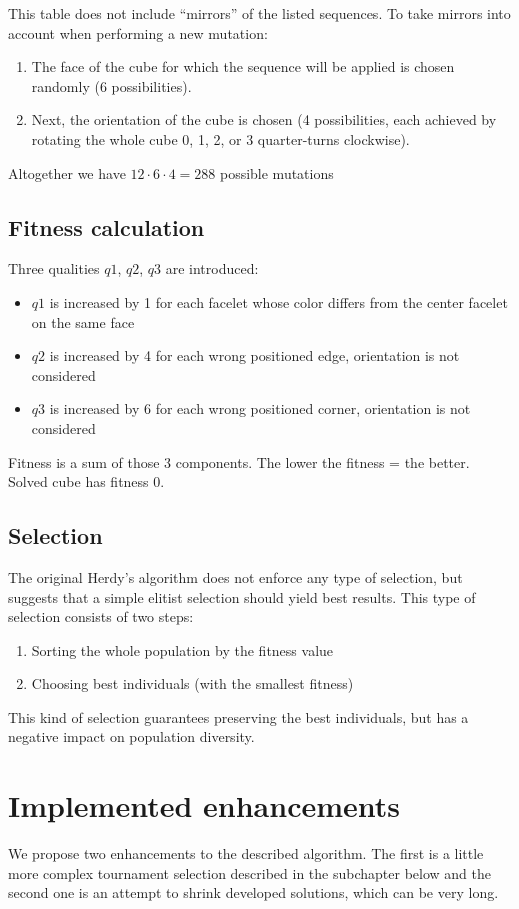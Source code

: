 \documentclass[a4paper]{article}
\begin{document}
This table does not include “mirrors” of the listed sequences.
To take mirrors into account when performing a new mutation:
\begin{enumerate}
\item The face of the cube for which the sequence will be applied is chosen randomly (6 possibilities).
\item Next, the orientation of the cube is chosen (4 possibilities, each achieved by rotating the whole cube 0, 1, 2, or 3 quarter-turns clockwise).
\end{enumerate}
Altogether we have $ 12\cdot6\cdot4 = 288 $ possible mutations

\subsection{Fitness calculation}
Three qualities $ q1 $, $ q2 $, $ q3 $ are introduced:
\begin{itemize}
\item $ q1 $ is increased by 1 for each facelet whose color differs from the center facelet on the same face
\item $ q2 $ is increased by 4 for each wrong positioned edge, orientation is not considered
\item $ q3 $ is increased by 6 for each wrong positioned corner, orientation is not considered
\end{itemize}
Fitness is a sum of those 3 components. The lower the fitness = the better. Solved cube has fitness 0.

\subsection{Selection}
The original Herdy’s algorithm does not enforce any type of selection, but suggests that a simple elitist selection should yield best results. This type of selection consists of two steps:

\begin{enumerate}
\item Sorting the whole population by the fitness value
\item Choosing  best individuals (with the smallest fitness)
\end{enumerate}

This kind of selection guarantees preserving the best individuals, but has a negative impact on population diversity.

\section{Implemented enhancements}
We propose two enhancements to the described algorithm. The first is a little more complex tournament selection described in the subchapter below and the second one is an attempt to shrink developed solutions, which can be very long.
\end{document}
